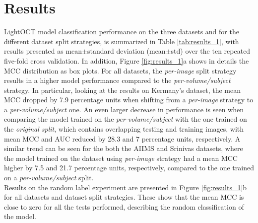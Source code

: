 \documentclass[fleqn,10pt]{wlscirep}
\begin{document}
\section*{Results}
LightOCT model classification performance on the three datasets and for the different dataset split strategies, is summarized in Table \ref{tab:results_1}, with results presented as mean$\pm$standard deviation (mean$\pm$std) over the ten repeated five-fold cross validation.  In addition, Figure \ref{fig:results_1}a shows in details the MCC distribution as box plots.  For all datasets, the \textit{per-image} split strategy results in a higher model performance compared to the \textit{per-volume/subject} strategy.  In particular, looking at the results on Kermany’s dataset, the mean MCC dropped by 7.9 percentage units when shifting from a \textit{per-image} strategy to a \textit{per-volume/subject} one.  An even larger decrease in performance is seen when comparing the model trained on the \textit{per-volume/subject} with the one trained on the \textit{original split},  which contains overlapping testing and training images,  with mean MCC and AUC reduced by 28.3 and 7 percentage units,  respectively.  A similar trend can be seen for the both the AIIMS and Srinivas datasets,  where the model trained on the dataset using \textit{per-image} strategy had a mean MCC higher by 7.5 and 21.7 percentage units, respectively,  compared to the one trained on a \textit{per-volume/subject} split.  \\
Results on the random label experiment are presented in Figure \ref{fig:results_1}b for all datasets and dataset split strategies.  These show that the mean MCC is close to zero for all the tests performed, describing the random classification of the model.
\end{document}
